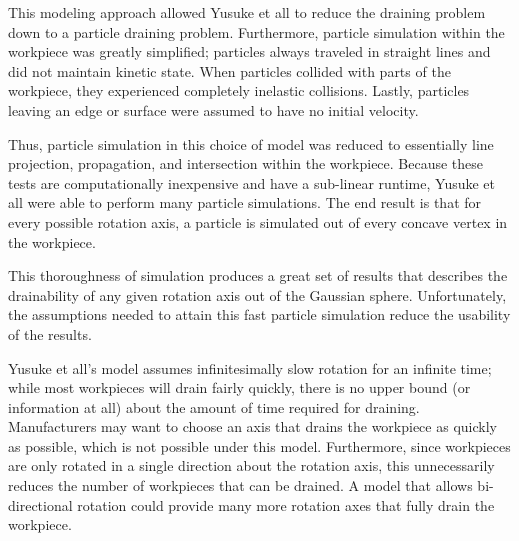 This modeling approach allowed Yusuke et all to reduce the draining problem down to a particle draining problem. Furthermore, particle simulation within the workpiece was greatly simplified; particles always traveled in straight lines and did not maintain kinetic state. When particles collided with parts of the workpiece, they experienced completely inelastic collisions. Lastly, particles leaving an edge or surface were assumed to have no initial velocity.

Thus, particle simulation in this choice of model was reduced to essentially line projection, propagation, and intersection within the workpiece. Because these tests are computationally inexpensive and have a sub-linear runtime, Yusuke et all were able to perform many particle simulations. The end result is that for every possible rotation axis, a particle is simulated out of every concave vertex in the workpiece.

This thoroughness of simulation produces a great set of results that describes the drainability of any given rotation axis out of the Gaussian sphere. Unfortunately, the assumptions needed to attain this fast particle simulation reduce the usability of the results.

Yusuke et all's model assumes infinitesimally slow rotation for an infinite time; while most workpieces will drain fairly quickly, there is no upper bound (or information at all) about the amount of time required for draining. Manufacturers may want to choose an axis that drains the workpiece as quickly as possible, which is not possible under this model.
Furthermore, since workpieces are only rotated in a single direction about the rotation axis, this unnecessarily reduces the number of workpieces that can be drained. A model that allows bi-directional rotation could provide many more rotation axes that fully drain the workpiece.





